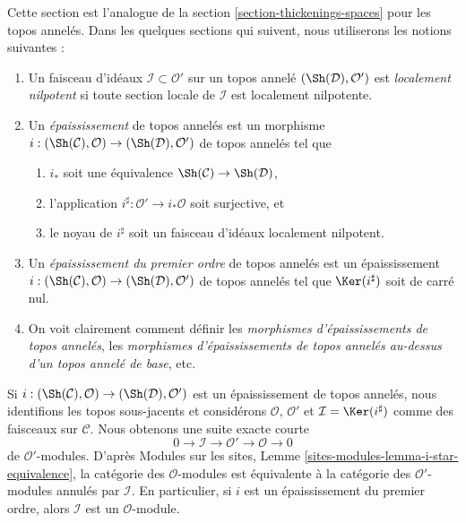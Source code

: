 \noindent
Cette section est l'analogue de la section \ref{section-thickenings-spaces}
pour les topos annelés.
Dans les quelques sections qui suivent, nous utiliserons les notions suivantes :
\begin{enumerate}
\item Un faisceau d'idéaux $\mathcal{I} \subset \mathcal{O}'$ sur un topos
annelé $(\Sh(\mathcal{D}), \mathcal{O}')$ est {\it localement nilpotent} si
toute section locale de $\mathcal{I}$ est localement nilpotente.
\item Un {\it épaississement} de topos annelés est un morphisme
$i : (\Sh(\mathcal{C}), \mathcal{O}) \to (\Sh(\mathcal{D}), \mathcal{O}')$
de topos annelés tel que
\begin{enumerate}
\item $i_*$ soit une équivalence $\Sh(\mathcal{C}) \to \Sh(\mathcal{D})$,
\item l'application $i^\sharp : \mathcal{O}' \to i_*\mathcal{O}$ soit
surjective, et
\item le noyau de $i^\sharp$ soit un faisceau d'idéaux localement nilpotent.
\end{enumerate}
\item Un {\it épaississement du premier ordre} de topos annelés est un
épaississement
$i : (\Sh(\mathcal{C}), \mathcal{O}) \to (\Sh(\mathcal{D}), \mathcal{O}')$
de topos annelés tel que $\Ker(i^\sharp)$ soit de carré nul.
\item On voit clairement comment définir les
{\it morphismes d'épaississements de topos annelés}, les
{\it morphismes d'épaississements de topos annelés au-dessus d'un topos annelé
de base}, etc.
\end{enumerate}
Si
$i : (\Sh(\mathcal{C}), \mathcal{O}) \to (\Sh(\mathcal{D}), \mathcal{O}')$
est un épaississement de topos annelés, nous identifions les topos sous-jacents
et considérons $\mathcal{O}$, $\mathcal{O}'$ et
$\mathcal{I} = \Ker(i^\sharp)$ comme des faisceaux sur $\mathcal{C}$.
Nous obtenons une suite exacte courte
$$
0 \to \mathcal{I} \to \mathcal{O}' \to \mathcal{O} \to 0
$$
de $\mathcal{O}'$-modules. D'après Modules sur les sites,
Lemme \ref{sites-modules-lemma-i-star-equivalence}, la catégorie des
$\mathcal{O}$-modules est équivalente à la catégorie des
$\mathcal{O}'$-modules annulés par $\mathcal{I}$. En particulier, si $i$ est un
épaississement du premier ordre, alors $\mathcal{I}$ est un
$\mathcal{O}$-module.

